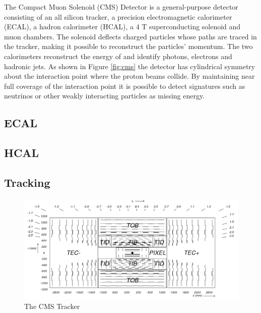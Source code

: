 
The Compact Muon Solenoid (CMS) Detector is a general-purpose detector consisting of 
an all silicon tracker, a precision electromagnetic calorimeter (ECAL), a hadron calorimeter
 (HCAL), a 4 T superconducting solenoid and muon chambers. The solenoid deflects charged
 particles whose paths are traced in the tracker, making it possible to 
reconstruct the particles’ momentum. The two calorimeters reconstruct the energy 
of and identify photons, electrons and hadronic jets.
As shown in Figure \ref{fig:cms} the detector has cylindrical symmetry about the
 interaction point where the proton beams collide. By maintaining near full coverage 
of the interaction point it is possible to detect signatures such as neutrinos or other weakly interacting particles as missing energy. 


\subsection{ECAL}

\subsection{HCAL}

\subsection{Tracking}

\begin{figure}
\begin{center}
\includegraphics[width=.9\textwidth]{figures/an_jetid/DETECTOR/cms_tracker}
\end{center}
\caption{The CMS Tracker}
\label{fig:tracker}
\end{figure}

